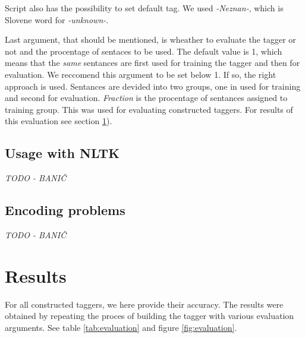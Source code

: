 \documentclass[11pt, conference, compsocconf]{IEEEtran}
\begin{document}
\par
Script also has the possibility to set default tag. We used \textit{-Neznan-}, which is Slovene word for \textit{-unknown-}.
\par
Last argument, that should be mentioned, is wheather to evaluate the tagger or not and the procentage of sentaces to be used. The default value is 1, which means that the \textit{same} sentances are first used for training the tagger and then for evaluation. We reccomend this argument to be set below 1. If so, the right approach is used.
Sentances are devided into two groups, one in used for training and second for evaluation. \textit{Fraction} is the procentage of sentances assigned to training group. 
This was used for evaluating constructed taggers. For results of this evaluation see section \ref{results}).

\subsection{Usage with NLTK} %
\textit{TODO - BANIČ}
\subsection{Encoding problems} %
\textit{TODO - BANIČ}

\section{Results} %
\label{results}
For all constructed taggers, we here provide their accuracy. The results were obtained by repeating the proces of building the tagger with various evaluation arguments. See table \ref{tab:evaluation} and figure \ref{fig:evaluation}.
\end{document}
